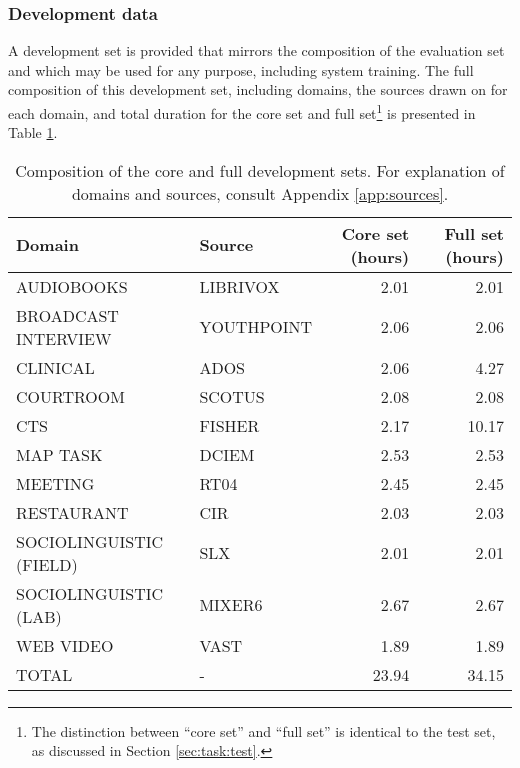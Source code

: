 \documentclass{article}
\begin{document}
\subsubsection{Development data}
A development set is provided that mirrors the composition of the evaluation set and which may be used for any purpose, including system training. The full composition of this development set, including domains, the sources drawn on for each domain, and total duration for the core set and full set\footnote{The distinction between ``core set'' and ``full set'' is identical to the test set, as discussed in Section \ref{sec:task:test}.} is presented in Table \ref{tab:single_chan_dev_set}.
%
\begin{table}[H]
    \centering
        \begin{tabular}{llrr}
        \hline
         {\bf Domain}               & {\bf Source} &  {\bf Core set (hours)} &   {\bf Full set (hours)} \\
        \hline
         AUDIOBOOKS                 & LIBRIVOX     &  2.01                   &        2.01 \\
         BROADCAST INTERVIEW        & YOUTHPOINT   &  2.06                   &        2.06 \\
         CLINICAL                   & ADOS         &  2.06                   &        4.27 \\
         COURTROOM                  & SCOTUS       &  2.08                   &        2.08 \\
         CTS                        & FISHER       &  2.17                   &       10.17 \\
         MAP TASK                   & DCIEM        &  2.53                   &        2.53 \\
         MEETING                    & RT04         &  2.45                   &        2.45 \\
        RESTAURANT                  & CIR          &  2.03                   &        2.03 \\
         SOCIOLINGUISTIC (FIELD)    & SLX          &  2.01                   &        2.01 \\
         SOCIOLINGUISTIC (LAB)      & MIXER6       &  2.67                   &        2.67 \\
         WEB VIDEO                  & VAST         &  1.89                   &        1.89 \\
         \hline
         TOTAL                      & -            &  23.94                  &       34.15 \\
        \hline
        \end{tabular}
    \caption{Composition of the core and full development sets. For explanation of domains and sources, consult Appendix \ref{app:sources}.}
    \label{tab:single_chan_dev_set}
\end{table}
\end{document}
